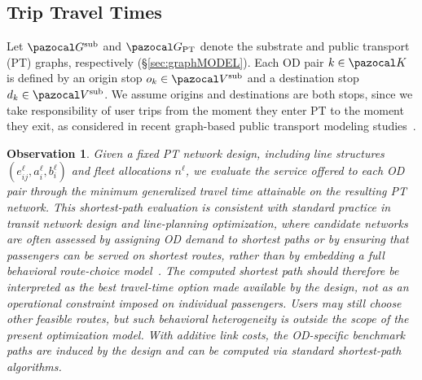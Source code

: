 \documentclass[a4paper,fleqn]{cas-sc}
\newtheorem{observation}{Observation}
\begin{document}
\subsection{Trip Travel Times}
\label{sec:trip-travel-times}

Let $\pazocal G^{\text{sub}}$ and $\pazocal G_{\text{PT}}$ denote the substrate and public transport (PT) graphs, respectively (\S\ref{sec:graphMODEL}). Each OD pair $k \in \pazocal K$ is defined by an origin stop $o_k \in \pazocal V^{\text{sub}}$ and a destination stop $d_k \in \pazocal V^{\text{sub}}$.
We assume origins and destinations are both stops, since we take responsibility of user trips from the moment they enter PT to the moment they exit, as considered in recent graph-based public transport modeling studies~\citep{zhao2024origin}.

\begin{observation}
\label{obs:det_routing}
Given a fixed PT network design, including line structures $(e_{ij}^\ell,a_i^\ell,b_i^\ell)$ and fleet allocations $n^\ell$, we evaluate the service offered to each OD pair through the minimum generalized travel time attainable on the resulting PT network. This shortest-path evaluation is consistent with standard practice in transit network design and line-planning optimization, where candidate networks are often assessed by assigning OD demand to shortest paths or by ensuring that passengers can be served on shortest routes, rather than by embedding a full behavioral route-choice model~\citep{Mumford2019}. The computed shortest path should therefore be interpreted as the best travel-time option made available by the design, not as an operational constraint imposed on individual passengers. Users may still choose other feasible routes, but such behavioral heterogeneity is outside the scope of the present optimization model. With additive link costs, the OD-specific benchmark paths are induced by the design and can be computed via standard shortest-path algorithms.
\end{observation}
\end{document}
